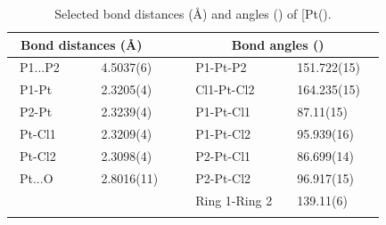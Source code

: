 \begin{table}[ht]
\caption[Bond distances (\AA) and angles (\degrees) of [Pt(\tButhixantphos)\ce{Cl2]}]{Selected bond distances (\AA) and angles (\degrees) of [Pt(\tButhixantphos)\ce{Cl2]}.}
\label{table:crystalthixantphosplatinumdichloride:lengths}
\small
\begin{center}
\begin{tabular}{l l l l}
	\toprule
	\multicolumn{2}{l}{\bfseries{~Bond distances (\si{\angstrom})}} & \multicolumn{2}{c}{\bfseries{Bond angles (\degrees)}} \\
	\midrule		
	~P1...P2		~~&~~4.5037(6)~~	&~~P1-Pt-P2			&~~151.722(15)~~	\\	
	~P1-Pt		~~&~~2.3205(4)~~	&~~Cl1-Pt-Cl2			&~~164.235(15)~~	\\
	~P2-Pt		~~&~~2.3239(4)~~	&~~P1-Pt-Cl1			&~~87.11(15)~~	\\
	~Pt-Cl1		~~&~~2.3209(4)~~	&~~P1-Pt-Cl2			&~~95.939(16)~~	\\
	~Pt-Cl2		~~&~~2.3098(4)~~	&~~P2-Pt-Cl1			&~~86.699(14)~~	\\
	~Pt...O		~~&~~2.8016(11)~~	&~~P2-Pt-Cl2			&~~96.917(15)~~	\\
	~				&			&~~Ring 1-Ring 2		&~~139.11(6)~~	\\
	\bottomrule{}
\end{tabular}
\end{center}
\end{table}

